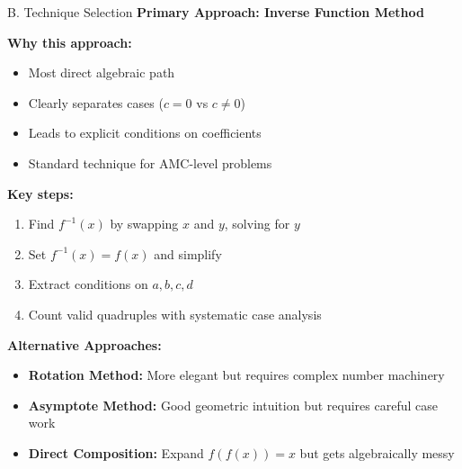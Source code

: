 \documentclass[12pt]{article}
\begin{document}
\begin{conversionbox}{B. Technique Selection}
\textbf{Primary Approach: Inverse Function Method}

\textbf{Why this approach:}
\begin{itemize}
    \item Most direct algebraic path
    \item Clearly separates cases ($c=0$ vs $c \neq 0$)
    \item Leads to explicit conditions on coefficients
    \item Standard technique for AMC-level problems
\end{itemize}

\textbf{Key steps:}
\begin{enumerate}
    \item Find $f^{-1}(x)$ by swapping $x$ and $y$, solving for $y$
    \item Set $f^{-1}(x) = f(x)$ and simplify
    \item Extract conditions on $a,b,c,d$
    \item Count valid quadruples with systematic case analysis
\end{enumerate}

\textbf{Alternative Approaches:}
\begin{itemize}
    \item \textbf{Rotation Method:} More elegant but requires complex number machinery
    \item \textbf{Asymptote Method:} Good geometric intuition but requires careful case work
    \item \textbf{Direct Composition:} Expand $f(f(x))=x$ but gets algebraically messy
\end{itemize}
\end{conversionbox}
\end{document}
